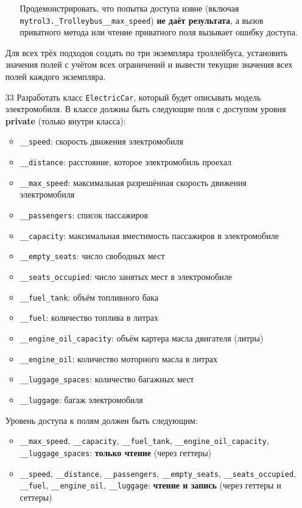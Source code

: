\begin{enumerate}
\begin{enumerate}
    Продемонстрировать, что попытка доступа извне (включая \texttt{mytrol3.\_Trolleybus\_\_max\_speed}) \textbf{не даёт результата}, а вызов приватного метода или чтение приватного поля вызывает ошибку доступа.
\end{enumerate}
Для всех трёх подходов создать по три экземпляра троллейбуса, установить значения полей с учётом всех ограничений и вывести текущие значения всех полей каждого экземпляра.
\item[33] Разработать класс \texttt{ElectricCar}, который будет описывать модель электромобиля. В классе должны быть следующие поля с доступом уровня \textbf{private} (только внутри класса):
\begin{itemize}
    \item \texttt{\_\_speed}: скорость движения электромобиля  
    \item \texttt{\_\_distance}: расстояние, которое электромобиль проехал  
    \item \texttt{\_\_max\_speed}: максимальная разрешённая скорость движения электромобиля  
    \item \texttt{\_\_passengers}: список пассажиров  
    \item \texttt{\_\_capacity}: максимальная вместимость пассажиров в электромобиле  
    \item \texttt{\_\_empty\_seats}: число свободных мест  
    \item \texttt{\_\_seats\_occupied}: число занятых мест в электромобиле  
    \item \texttt{\_\_fuel\_tank}: объём топливного бака  
    \item \texttt{\_\_fuel}: количество топлива в литрах  
    \item \texttt{\_\_engine\_oil\_capacity}: объём картера масла двигателя (литры)  
    \item \texttt{\_\_engine\_oil}: количество моторного масла в литрах  
    \item \texttt{\_\_luggage\_spaces}: количество багажных мест  
    \item \texttt{\_\_luggage}: багаж электромобиля  
\end{itemize}
Уровень доступа к полям должен быть следующим:
\begin{itemize}
    \item \texttt{\_\_max\_speed}, \texttt{\_\_capacity}, \texttt{\_\_fuel\_tank}, \texttt{\_\_engine\_oil\_capacity}, \texttt{\_\_luggage\_spaces}: \textbf{только чтение} (через геттеры)  
    \item \texttt{\_\_speed}, \texttt{\_\_distance}, \texttt{\_\_passengers}, \texttt{\_\_empty\_seats}, \texttt{\_\_seats\_occupied}, \texttt{\_\_fuel}, \texttt{\_\_engine\_oil}, \texttt{\_\_luggage}: \textbf{чтение и запись} (через геттеры и сеттеры)

\end{itemize}
\end{enumerate}
